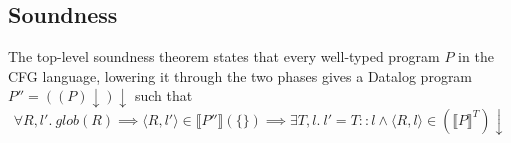 \documentclass[11pt]{article}
\begin{document}
\subsection{Soundness}
The top-level soundness theorem states that every well-typed program $P$ in the CFG language, lowering it through the two phases gives a Datalog program $P'' = ((P)\downarrow)\downarrow$ such that
\[
\forall R, l'.~\mathit{glob}(R) \implies \langle R, l' \rangle \in \llbracket P'' \rrbracket(\{\}) \implies \exists T, l.~l' = T :: l \land \langle R, l \rangle \in (\llbracket P \rrbracket^T)\downarrow
\]
\end{document}
